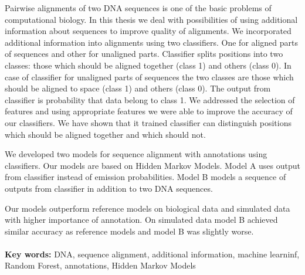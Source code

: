 Pairwise alignments of two DNA sequences is one of the basic problems of computational biology. In this thesis we deal with possibilities of using additional information about sequences to improve quality of alignments.
We incorporated additional information into alignments using two classifiers. One for aligned parts of sequences and other for unaligned parts.
Classifier splits positions into two classes: those which should be aligned together (class 1) and others (class 0). In case of classifier for unaligned parts of sequences the two classes are those which should be aligned to space (class 1) and others (class 0). The output from classifier is probability that data belong to class 1.
We addressed the selection of features and using appropriate features we were able to improve the accuracy of our classifiers.
We have shown that it trained classifier can distinguish positions which should be aligned together and which should not.

We developed two models for sequence alignment with annotations using classifiers. Our models are based on Hidden Markov Models.
Model A uses output from classifier instead of emission probabilities.
Model B models a sequence of outputs from classifier in addition to two DNA sequences.

Our models outperform reference models on biological data and simulated data with higher importance of annotation.
On simulated data model B achieved similar accuracy as reference models and model B was slightly worse.
\\ \\
{\bf Key words:} DNA, sequence alignment, additional information, machine learninf, Random Forest, annotations, Hidden Markov Models
